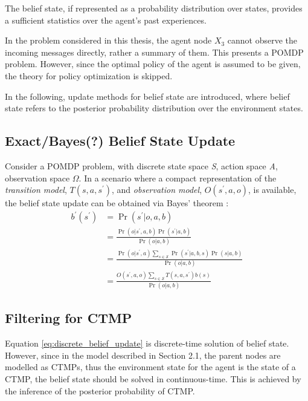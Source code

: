 The belief state, if represented as a probability distribution over states, provides a sufficient statistics over the agent's past experiences. 

In the problem considered in this thesis, the agent node $ X_{3} $ cannot observe the incoming messages directly, rather a summary of them. This presents a POMDP problem. However, since the optimal policy of the agent is assumed to be given, the theory for policy optimization is skipped. 

In the following, update methods for belief state are introduced, where belief state refers to the posterior probability distribution over the environment states.

\subsection{Exact/Bayes(?) Belief State Update}
\label{sec:exact_update}
Consider a POMDP problem, with discrete state space \textit{S}, action space \textit{A}, observation space $ \Omega $. In a scenario where a compact representation of the \textit{transition model}, $ T(s, a, s^{\prime})$,  and \textit{observation model}, $ O(s^{\prime}, a, o) $, is available, the belief state update can be obtained via Bayes' theorem \cite{KAELBLING199899}:
\begin{align}
b^{\prime}\left(s^{\prime}\right) &=\operatorname{Pr}\left(s^{\prime} | o, a, b\right) \nonumber\\
&=\frac{\operatorname{Pr}\left(o | s^{\prime}, a, b\right) \operatorname{Pr}\left(s^{\prime} | a, b\right)}{\operatorname{Pr}(o | a, b)} \nonumber\\
&=\frac{\operatorname{Pr}\left(o | s^{\prime}, a\right) \sum_{s \in \mathcal{S}} \operatorname{Pr}\left(s^{\prime} | a, b, s\right) \operatorname{Pr}(s | a, b)}{\operatorname{Pr}(o | a, b)} \nonumber\\
&=\frac{O\left(s^{\prime}, a, o\right) \sum_{s \in \mathcal{S}} T\left(s,a, s^{\prime}\right) b(s)}{\operatorname{Pr}(o | a, b)}
\label{eq:discrete_belief_update}
\end{align}

\subsection{Filtering for CTMP}
\label{sec:filtering_CTMC}
Equation \ref{eq:discrete_belief_update} is discrete-time solution of belief state. However, since in the model described in Section 2.1, the parent nodes are modelled as CTMPs, thus the environment state for the agent is the state of a CTMP, the belief state should be solved in continuous-time. This is achieved by the inference of the posterior probability of CTMP. \cite{article}

